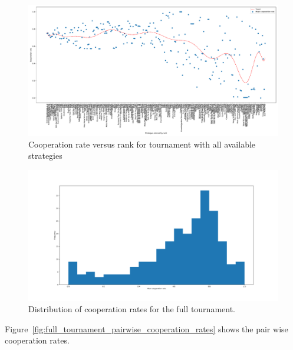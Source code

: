 \documentclass{article}
\begin{document}
\begin{figure}[!hbtp]
    \centering
    \includegraphics[width=.8\textwidth]{assets/full_tournament_cooperation_rate_versus_rank.pdf}
    \caption{Cooperation rate versus rank for tournament with all available
    strategies}
    \label{fig:full_tournament_cooperation_rate_versus_rank}
\end{figure}

\begin{figure}[!hbtp]
    \centering
    \includegraphics[width=.8\textwidth]{assets/full_tournament_cooperation_rates.pdf}
    \caption{Distribution of cooperation rates for the full tournament.}
    \label{fig:full_tournament_cooperation_rates}
\end{figure}

Figure~\ref{fig:full_tournament_pairwise_cooperation_rates} shows the pair wise
cooperation rates.
\end{document}
